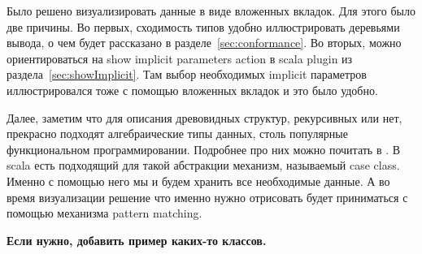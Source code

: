 Было решено визуализировать данные в виде вложенных вкладок.
Для этого было две причины.
Во первых, сходимость типов удобно иллюстрировать деревьями вывода,
о чем будет рассказано в разделе~\ref{sec:conformance}.
Во вторых, можно ориентироваться на show implicit parameters action
в scala plugin из раздела~\ref{sec:showImplicit}.
Там выбор необходимых implicit параметров иллюстрировался тоже с помощью
вложенных вкладок и это было удобно.

Далее, заметим что для описания древовидных структур, рекурсивных или нет,
прекрасно подходят алгебраические типы данных, столь популярные функциональном
программировании.
Подробнее про них можно почитать в \cite{algebraic_data}.
В scala есть подходящий для такой абстракции механизм, называемый case class.
Именно с помощью него мы и будем хранить все необходимые данные.
А во время визуализации решение что именно нужно отрисовать будет приниматься
с помощью механизма pattern matching.

\textbf{Если нужно, добавить пример каких-то классов.}
